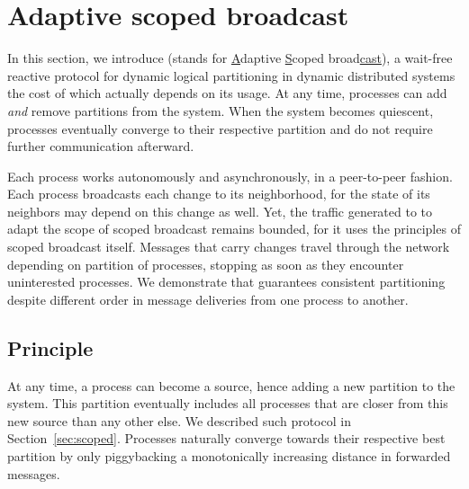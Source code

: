 



\section{Adaptive scoped broadcast}
\label{sec:adaptive}

In this section, we introduce \NAME (stands for \underline{A}daptive
\underline{S}coped broad\underline{cast}), a wait-free reactive
protocol for dynamic logical partitioning in dynamic distributed
systems the cost of which actually depends on its usage. At any time,
processes can add \emph{and} remove partitions from the system. When
the system becomes quiescent, processes eventually converge to their
respective partition and do not require further communication
afterward.

Each process works autonomously and asynchronously, in a peer-to-peer
fashion. Each process broadcasts each change to its neighborhood, for
the state of its neighbors may depend on this change as well. Yet, the
traffic generated to to adapt the scope of scoped broadcast remains
bounded, for it uses the principles of scoped broadcast
itself. Messages that carry changes travel through the network
depending on partition of processes, stopping as soon as they
encounter uninterested processes. We demonstrate that \NAME guarantees
consistent partitioning despite different order in message deliveries
from one process to another.








\subsection{Principle}
At any time, a process can become a source, hence adding a new
partition to the system. This partition eventually includes all
processes that are closer from this new source than any other else. We
described such protocol in Section~\ref{sec:scoped}. Processes
naturally converge towards their respective best partition by only
piggybacking a monotonically increasing distance in forwarded
messages. %

